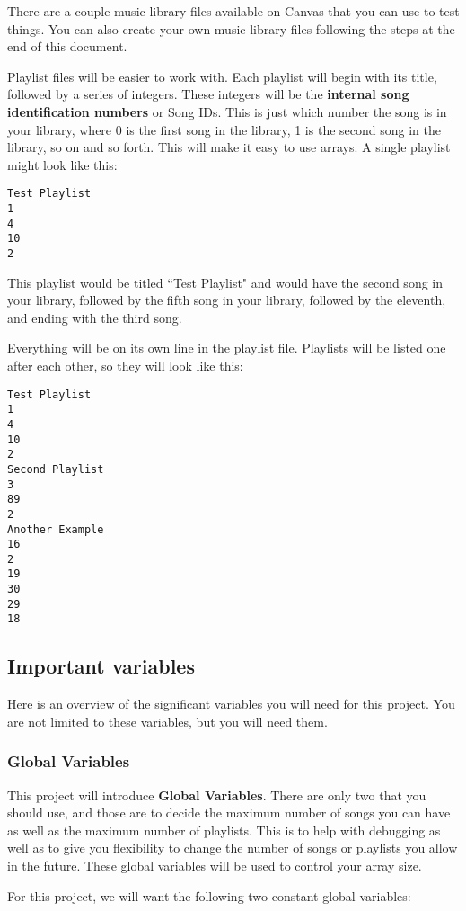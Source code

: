 There are a couple music library files available on Canvas that you can use to test things. You can also create your own music library files following the steps at the end of this document.

Playlist files will be easier to work with. Each playlist will begin with its title, followed by a series of integers. These integers will be the \textbf{internal song identification numbers} or Song IDs. This is just which number the song is in your library, where 0 is the first song in the library, 1 is the second song in the library, so on and so forth. This will make it easy to use arrays. A single playlist might look like this:

\begin{verbatim}
Test Playlist
1
4
10
2
\end{verbatim}

This playlist would be titled ``Test Playlist" and would have the second song in your library, followed by the fifth song in your library, followed by the eleventh, and ending with the third song.

Everything will be on its own line in the playlist file. Playlists will be listed one after each other, so they will look like this:

\begin{verbatim}
Test Playlist
1
4
10
2
Second Playlist
3
89
2
Another Example
16
2
19
30
29
18
\end{verbatim}

\subsection{Important variables}
Here is an overview of the significant variables you will need for this project. You are not limited to these variables, but you will need them.

\subsubsection{Global Variables}
This project will introduce \textbf{Global Variables}. There are only two that you should use, and those are to decide the maximum number of songs you can have as well as the maximum number of playlists. This is to help with debugging as well as to give you flexibility to change the number of songs or playlists you allow in the future. These global variables will be used to control your array size. 

For this project, we will want the following two constant global variables:


